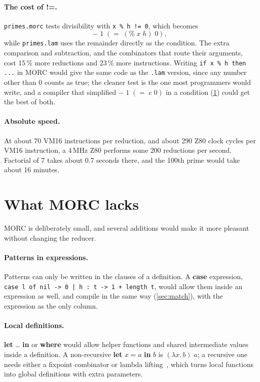 \documentclass[11pt,a4paper]{article}
\theoremstyle{definition}
\theoremstyle{plain}
\newcommand{\kw}[1]{\textbf{#1}}
\begin{document}
\paragraph{The cost of !=.} \texttt{primes.morc} tests divisibility with
\verb|x % h != 0|, which becomes
\[
  {-}\;1\;({=}\;({\%}\;x\;h)\;0),
\]
while
\texttt{primes.lam} uses the remainder directly as the condition. The extra
comparison and subtraction, and the combinators that route their arguments,
cost 15\,\% more reductions and 23\,\% more instructions. Writing
\verb|if x % h then ...| in MORC would give the same code as the
\texttt{.lam} version, since any number other than 0 counts as true; the
cleaner test is the one most programmers would write, and a compiler that
simplified ${-}\;1\;({=}\;e\;0)$ in a condition (\cref{sec:lacks}) could get
the best of both.

\paragraph{Absolute speed.} At about 70 VM16 instructions per reduction, and
about 290 Z80 clock cycles per VM16 instruction, a 4\,MHz Z80 performs some
200 reductions per second. Factorial of 7 takes about 0.7 seconds there, and
the 100th prime would take about 16 minutes.

\section{What MORC lacks}\label{sec:lacks}

MORC is deliberately small, and several additions would make it more
pleasant without changing the reducer.

\paragraph{Patterns in expressions.} Patterns can only be written in the
clauses of a definition. A \kw{case} expression,
\verb!case l of nil -> 0 | h : t -> 1 + length t!, would allow them inside
an expression as well, and compile in the same way (\cref{sec:match}), with
the expression as the only column.

\paragraph{Local definitions.} \kw{let} \ldots{} \kw{in} or \kw{where} would
allow helper functions and shared intermediate values inside a definition.
A non-recursive \kw{let} $x = a$ \kw{in} $b$ is $(\lambda x.\,b)\;a$; a
recursive one needs either a fixpoint combinator or lambda
lifting~\cite{pj87}, which turns local functions into global definitions with
extra parameters.
\end{document}
